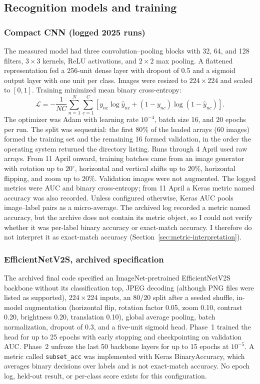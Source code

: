 \documentclass[11pt]{article}
\begin{document}
\subsection{Recognition models and training}

\subsubsection*{Compact CNN (logged 2025 runs)}
The measured model had three convolution--pooling blocks with 32, 64, and 128 filters, $3\times3$ kernels, ReLU activations, and $2\times2$ max pooling. A flattened representation fed a 256-unit dense layer with dropout of 0.5 and a sigmoid output layer with one unit per class. Images were resized to 224\,$\times$\,224 and scaled to $[0,1]$. Training minimized mean binary cross-entropy:
\begin{equation}
\mathcal{L}=-\frac{1}{NC}\sum_{n=1}^{N}\sum_{c=1}^{C}\left[y_{nc}\log\hat{y}_{nc}+(1-y_{nc})\log(1-\hat{y}_{nc})\right].
\label{eq:bce}
\end{equation}
The optimizer was Adam \citep{kingma2015} with learning rate $10^{-4}$, batch size 16, and 20 epochs per run. The split was sequential: the first 80\% of the loaded arrays (60 images) formed the training set and the remaining 16 formed validation, in the order the operating system returned the directory listing. Runs through 4 April used raw arrays. From 11 April onward, training batches came from an image generator with rotation up to $20^\circ$, horizontal and vertical shifts up to 20\%, horizontal flipping, and zoom up to 20\%. Validation images were not augmented. The logged metrics were AUC and binary cross-entropy; from 11 April a Keras metric named accuracy was also recorded. Unless configured otherwise, Keras AUC pools image--label pairs as a micro-average. The archived log recorded a metric named accuracy, but the archive does not contain its metric object, so I could not verify whether it was per-label binary accuracy or exact-match accuracy. I therefore do not interpret it as exact-match accuracy (Section~\ref{sec:metric-interpretation}).

\subsubsection*{EfficientNetV2S, archived specification}
The archived final code specified an ImageNet-pretrained EfficientNetV2S backbone without its classification top, JPEG decoding (although PNG files were listed as supported), 224\,$\times$\,224 inputs, an 80/20 split after a seeded shuffle, in-model augmentation (horizontal flip, rotation factor 0.05, zoom 0.10, contrast 0.20, brightness 0.20, translation 0.10), global average pooling, batch normalization, dropout of 0.3, and a five-unit sigmoid head. Phase~1 trained the head for up to 25 epochs with early stopping and checkpointing on validation AUC. Phase~2 unfroze the last 50 backbone layers for up to 15 epochs at $10^{-5}$. A metric called \texttt{subset\_acc} was implemented with Keras BinaryAccuracy, which averages binary decisions over labels and is not exact-match accuracy. No epoch log, held-out result, or per-class score exists for this configuration.
\end{document}
